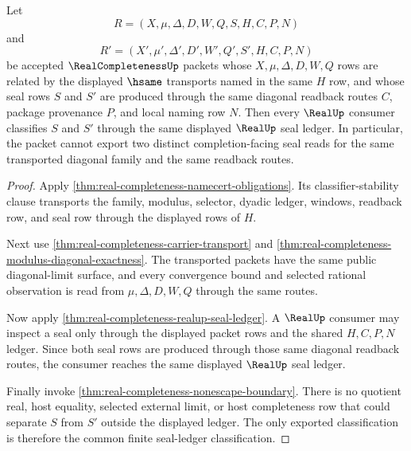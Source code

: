 \begin{theorem}
\label{thm:real-completeness-candidate-uniqueness-boundary}
Let
$$
R=(X,\mu,\Delta,D,W,Q,S,H,C,P,N)
$$
and
$$
R'=(X',\mu',\Delta',D',W',Q',S',H,C,P,N)
$$
be accepted $\RealCompletenessUp$ packets whose $X,\mu,\Delta,D,W,Q$ rows are related by the displayed $\hsame$ transports named in the same $H$ row, and whose seal rows $S$ and $S'$ are produced through the same diagonal readback routes $C$, package provenance $P$, and local naming row $N$. Then every $\RealUp$ consumer classifies $S$ and $S'$ through the same displayed $\RealUp$ seal ledger. In particular, the packet cannot export two distinct completion-facing seal reads for the same transported diagonal family and the same readback routes.
\end{theorem}
\begin{proof}
Apply \autoref{thm:real-completeness-namecert-obligations}. Its classifier-stability clause transports the family, modulus, selector, dyadic ledger, windows, readback row, and seal row through the displayed rows of $H$.

Next use \autoref{thm:real-completeness-carrier-transport} and \autoref{thm:real-completeness-modulus-diagonal-exactness}. The transported packets have the same public diagonal-limit surface, and every convergence bound and selected rational observation is read from $\mu,\Delta,D,W,Q$ through the same routes.

Now apply \autoref{thm:real-completeness-realup-seal-ledger}. A $\RealUp$ consumer may inspect a seal only through the displayed packet rows and the shared $H,C,P,N$ ledger. Since both seal rows are produced through those same diagonal readback routes, the consumer reaches the same displayed $\RealUp$ seal ledger.

Finally invoke \autoref{thm:real-completeness-nonescape-boundary}. There is no quotient real, host equality, selected external limit, or host completeness row that could separate $S$ from $S'$ outside the displayed ledger. The only exported classification is therefore the common finite seal-ledger classification.
\end{proof}

